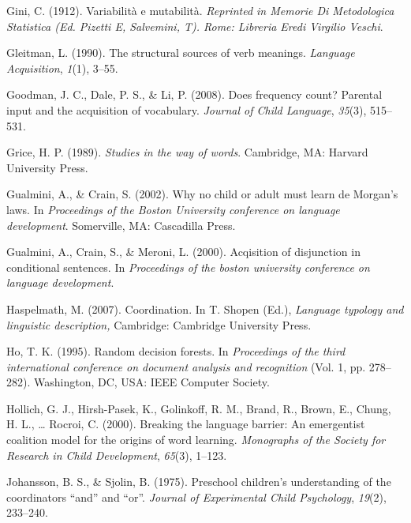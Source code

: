 \documentclass[,man,floatsintext]{apa6}
\begin{document}
\leavevmode\hypertarget{ref-gini1912variabilita}{}%
Gini, C. (1912). Variabilità e mutabilità. \emph{Reprinted in Memorie Di Metodologica Statistica (Ed. Pizetti E, Salvemini, T). Rome: Libreria Eredi Virgilio Veschi}.

\leavevmode\hypertarget{ref-gleitman1990structural}{}%
Gleitman, L. (1990). The structural sources of verb meanings. \emph{Language Acquisition}, \emph{1}(1), 3--55.

\leavevmode\hypertarget{ref-goodman2008does}{}%
Goodman, J. C., Dale, P. S., \& Li, P. (2008). Does frequency count? Parental input and the acquisition of vocabulary. \emph{Journal of Child Language}, \emph{35}(3), 515--531.

\leavevmode\hypertarget{ref-grice1989studies}{}%
Grice, H. P. (1989). \emph{Studies in the way of words}. Cambridge, MA: Harvard University Press.

\leavevmode\hypertarget{ref-gualminicrain2002}{}%
Gualmini, A., \& Crain, S. (2002). Why no child or adult must learn de Morgan's laws. In \emph{Proceedings of the Boston University conference on language development}. Somerville, MA: Cascadilla Press.

\leavevmode\hypertarget{ref-gualmini2000}{}%
Gualmini, A., Crain, S., \& Meroni, L. (2000). Acqisition of disjunction in conditional sentences. In \emph{Proceedings of the boston university conference on language development}.

\leavevmode\hypertarget{ref-haspelmath2007}{}%
Haspelmath, M. (2007). Coordination. In T. Shopen (Ed.), \emph{Language typology and linguistic description,} Cambridge: Cambridge University Press.

\leavevmode\hypertarget{ref-ho1995random}{}%
Ho, T. K. (1995). Random decision forests. In \emph{Proceedings of the third international conference on document analysis and recognition} (Vol. 1, pp. 278--282). Washington, DC, USA: IEEE Computer Society.

\leavevmode\hypertarget{ref-hollich2000breaking}{}%
Hollich, G. J., Hirsh-Pasek, K., Golinkoff, R. M., Brand, R., Brown, E., Chung, H. L., \ldots{} Rocroi, C. (2000). Breaking the language barrier: An emergentist coalition model for the origins of word learning. \emph{Monographs of the Society for Research in Child Development}, \emph{65}(3), 1--123.

\leavevmode\hypertarget{ref-johansson1975preschool}{}%
Johansson, B. S., \& Sjolin, B. (1975). Preschool children's understanding of the coordinators ``and'' and ``or''. \emph{Journal of Experimental Child Psychology}, \emph{19}(2), 233--240.
\end{document}
